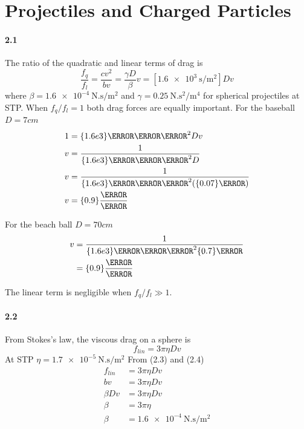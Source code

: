 \documentclass[../problems.tex]{subfiles}
\begin{document}
\section{Projectiles and Charged Particles}
\barh

\paragraph{2.1}
The ratio of the quadratic and linear terms of drag is
\begin{equation*} \tag{2.7}
    \frac{f_q}{f_l} = \frac{cv^2}{bv} = \frac{\gamma D}{\beta} v = [ \qty{1.6e3}{\s  \per \m^2}] Dv
\end{equation*}
where $\beta = \qty{1.6e-4}{\N.\s\per\m^2}$ and $\gamma = \qty{0.25}{\N.\s^2\per\m^4}$ for spherical
projectiles at STP. When $f_q/f_l = 1$ both drag forces are equally important.
\barh
For the baseball $D = 7 \si{cm}$ 
\begin{align*}
    1 &= \qty{1.6e3}{\s  \per \m^2} Dv \\
    v &= \frac{1}{\qty{1.6e3}{\s  \per \m^2} D} \\
    v &= \frac{1}{\qty{1.6e3}{\s  \per \m^2} (\qty{0.07}{\m})} \\
    v &= \qty{0.9}{\frac{\cm}{\s}}
\end{align*}

For the beach ball $D = 70 \si{cm}$
\begin{align*}
    v &= \frac{1}{\qty{1.6e3}{\s  \per \m^2} \qty{0.7}{\m}} \\
    &= \qty{0.9}{\frac{\mm}{\s}}
\end{align*}

The linear term is negligible when $f_q/f_l \gg 1$.

\paragraph{2.2}
From Stokes's law, the viscous drag on a sphere is
\begin{equation*} \tag{2.82}
    f_{lin} = 3\pi \eta D v
\end{equation*}
At STP $\eta = \qty{1.7e-5}{\N.\s\per\m^2}$
\barh
From (2.3) and (2.4)
\begin{align*}
    f_{lin} &= 3\pi \eta D v \\
    bv &= 3\pi \eta D v \\
    \beta D v &= 3\pi \eta D v \\
    \beta &= 3\pi \eta \\
    \beta &= \qty{1.6e-4}{\N.\s\per\m^2}
\end{align*}
\end{document}
